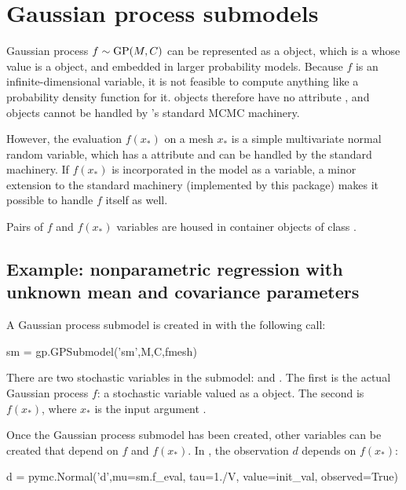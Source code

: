 






\section{Gaussian process submodels}

Gaussian process $f\sim \textup{GP}(M,C)$ can be represented as a  object, which is a   \citep{pymc} whose value is a  object, and embedded in larger probability models. Because $f$ is an infinite-dimensional variable, it is not feasible to compute anything like a probability density function for it.  objects therefore have no  attribute \citep{pymc}, and  objects cannot be handled by 's standard MCMC machinery.

However, the evaluation $f(x_*)$ on a mesh $x_*$ is a simple multivariate normal random variable, which has a  attribute and can be handled by the standard machinery. If $f(x_*)$ is incorporated in the model as a variable, a minor extension to the standard machinery (implemented by this package) makes it possible to handle $f$ itself as well.

Pairs of $f$ and $f(x_*)$ variables are housed in container objects of class .






\subsection{Example: nonparametric regression with unknown mean and covariance parameters}\label{sub:BasicMCMC}

A Gaussian process submodel is created in  with the following call:
\begin{CodeChunk}
\begin{CodeInput}
sm = gp.GPSubmodel('sm',M,C,fmesh)
\end{CodeInput}
\end{CodeChunk}
There are two stochastic variables in the submodel:  and . The first is the actual Gaussian process $f$: a stochastic variable valued as a  object. The second is $f(x_*)$, where $x_*$ is the input argument .

Once the Gaussian process submodel has been created, other variables can be created that depend on $f$ and $f(x_*)$. In , the observation $d$ depends on $f(x_*)$: 
\begin{CodeChunk}
\begin{CodeInput}
d = pymc.Normal('d',mu=sm.f_eval, tau=1./V, value=init_val, observed=True)
\end{CodeInput}
\end{CodeChunk}

